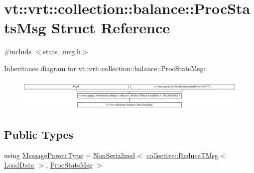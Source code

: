 \hypertarget{structvt_1_1vrt_1_1collection_1_1balance_1_1_proc_stats_msg}{}\section{vt\+:\+:vrt\+:\+:collection\+:\+:balance\+:\+:Proc\+Stats\+Msg Struct Reference}
\label{structvt_1_1vrt_1_1collection_1_1balance_1_1_proc_stats_msg}


{\ttfamily \#include $<$stats\+\_\+msg.\+h$>$}

Inheritance diagram for vt\+:\+:vrt\+:\+:collection\+:\+:balance\+:\+:Proc\+Stats\+Msg\+:\begin{figure}[H]
\begin{center}
\leavevmode
\includegraphics[height=1.593928cm]{structvt_1_1vrt_1_1collection_1_1balance_1_1_proc_stats_msg}
\end{center}
\end{figure}
\subsection*{Public Types}
\begin{DoxyCompactItemize}
\item 
using \hyperlink{structvt_1_1vrt_1_1collection_1_1balance_1_1_proc_stats_msg_a883f509d9a4ce6f095a9a680e5199cde}{Message\+Parent\+Type} = \hyperlink{namespacevt_a378e4a02213923b4ba1c3f9d2a1424c7}{Non\+Serialized}$<$ \hyperlink{namespacevt_1_1collective_a28b82d5d48c9bc6e4fd738fcbf9e0f62}{collective\+::\+Reduce\+T\+Msg}$<$ \hyperlink{structvt_1_1vrt_1_1collection_1_1balance_1_1_load_data}{Load\+Data} $>$, \hyperlink{structvt_1_1vrt_1_1collection_1_1balance_1_1_proc_stats_msg}{Proc\+Stats\+Msg} $>$
\end{DoxyCompactItemize}
